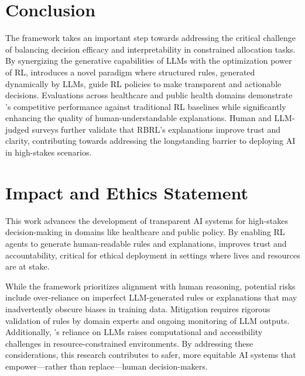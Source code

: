 \section{Conclusion}
\label{sec:conclusion}


The \rbrl framework takes an important step towards addressing the critical challenge of balancing decision efficacy and interpretability in constrained allocation tasks. By synergizing the generative capabilities of LLMs with the optimization power of RL, \rbrl introduces a novel paradigm where structured rules, generated dynamically by LLMs, guide RL policies to make transparent and actionable decisions. Evaluations across healthcare and public health domains demonstrate \rbrl’s competitive performance against traditional RL baselines while significantly enhancing the quality of human-understandable explanations. Human and LLM-judged surveys further validate that RBRL’s explanations improve trust and clarity, contributing towards addressing the longstanding barrier to deploying AI in high-stakes scenarios.



\section*{Impact and Ethics Statement}
This work advances the development of transparent AI systems for high-stakes decision-making in domains like healthcare and public policy. By enabling RL agents to generate human-readable rules and explanations, \rbrl improves trust and accountability, critical for ethical deployment in settings where lives and resources are at stake.

While the framework prioritizes alignment with human reasoning, potential risks include over-reliance on imperfect LLM-generated rules or explanations that may inadvertently obscure biases in training data. Mitigation requires rigorous validation of rules by domain experts and ongoing monitoring of LLM outputs. Additionally, \rbrl’s reliance on LLMs raises computational and accessibility challenges in resource-constrained environments. By addressing these considerations, this research contributes to safer, more equitable AI systems that empower—rather than replace—human decision-makers.

